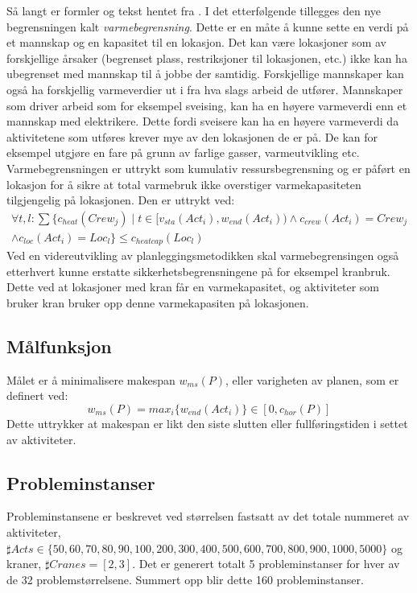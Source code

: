 Så langt er formler og tekst hentet fra \cite{tvedtbezem}. I det etterfølgende tillegges den nye begrensningen kalt \textit{varmebegrensning}. Dette er en måte å kunne sette en verdi på et mannskap og en kapasitet til en lokasjon. Det kan være lokasjoner som av forskjellige årsaker (begrenset plass, restriksjoner til lokasjonen, etc.) ikke kan ha ubegrenset med mannskap til å jobbe der samtidig. Forskjellige mannskaper kan også ha forskjellig varmeverdier ut i fra hva slags arbeid de utfører. Mannskaper som driver arbeid som for eksempel sveising, kan ha en høyere varmeverdi enn et mannskap med elektrikere. Dette fordi sveisere kan ha en høyere varmeverdi da aktivitetene som utføres krever mye av den lokasjonen de er på. De kan for eksempel utgjøre en fare på grunn av farlige gasser, varmeutvikling etc. Varmebegrensningen er uttrykt som kumulativ ressursbegrensning og er påført en lokasjon for å sikre at total varmebruk ikke overstiger varmekapasiteten tilgjengelig på lokasjonen. Den er uttrykt ved:
\begin{equation}
\begin{split}
\forall t,l: \sum\{c_{heat}(Crew_j) \mid t \in [ v_{sta}(Act_{i}), w_{end}(Act_{i})) \wedge c_{crew}(Act_{i}) = Crew_{j} \\
\wedge c_{loc}(Act_{i}) = Loc_{l} \} \le c_{heatcap}(Loc_{l})
\end{split}
\end{equation}
Ved en videreutvikling av planleggingsmetodikken skal varmebegrensingen også etterhvert kunne erstatte sikkerhetsbegrensningene på for eksempel kranbruk. Dette ved at lokasjoner med kran får en varmekapasitet, og aktiviteter som bruker kran bruker opp denne varmekapasiten på lokasjonen.

\subsection{Målfunksjon}
\label{sec:makespandef}
Målet er å minimalisere makespan $ w_{ms}(P) $, eller varigheten av planen, som er definert ved:
\begin{equation}
w_{ms}(P) = max_{i} \{ w_{end}(Act_{i}) \} \in [0,c_{hor}(P)]
\end{equation}
Dette uttrykker at makespan er likt den siste slutten eller fullføringstiden i settet av aktiviteter.

\subsection{Probleminstanser}
Probleminstansene er beskrevet ved størrelsen fastsatt av det totale nummeret av aktiviteter, $ \sharp Acts \in \{ 50,60, 70, 80, 90, 100, 200, 300, 400, 500, 600, 700, 800, 900, 1000, 5000 \} $ og kraner, $ \sharp Cranes = [2,3] $. Det er generert totalt 5 probleminstanser for hver av de 32 problemstørrelsene. Summert opp blir dette 160 probleminstanser.

